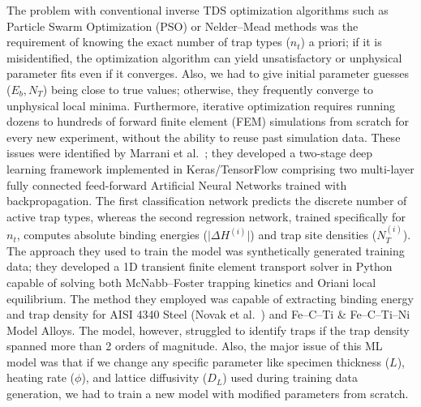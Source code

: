 \documentclass[a4paper,12pt,oneside]{report}
\begin{document}
The problem with conventional inverse TDS optimization algorithms such as Particle Swarm Optimization (PSO) or Nelder--Mead methods was the requirement of knowing the exact number of trap types ($n_t$) a priori; if it is misidentified, the optimization algorithm can yield unsatisfactory or unphysical parameter fits even if it converges. Also, we had to give initial parameter guesses ($E_b, N_T$) being close to true values; otherwise, they frequently converge to unphysical local minima. Furthermore, iterative optimization requires running dozens to hundreds of forward finite element (FEM) simulations from scratch for every new experiment, without the ability to reuse past simulation data. These issues were identified by Marrani et al.~\cite{Marrani2025}; they developed a two-stage deep learning framework implemented in Keras/TensorFlow comprising two multi-layer fully connected feed-forward Artificial Neural Networks trained with backpropagation. The first classification network predicts the discrete number of active trap types, whereas the second regression network, trained specifically for $n_t$, computes absolute binding energies ($\vert{}\Delta H^{(i)}\vert{}$) and trap site densities ($N_T^{(i)}$). The approach they used to train the model was synthetically generated training data; they developed a 1D transient finite element transport solver in Python capable of solving both McNabb--Foster trapping kinetics and Oriani local equilibrium. The method they employed was capable of extracting binding energy and trap density for AISI 4340 Steel (Novak et al.~\cite{Novak2010}) and Fe--C--Ti \& Fe--C--Ti--Ni Model Alloys. The model, however, struggled to identify traps if the trap density spanned more than 2 orders of magnitude. Also, the major issue of this ML model was that if we change any specific parameter like specimen thickness ($L$), heating rate ($\phi$), and lattice diffusivity ($D_L$) used during training data generation, we had to train a new model with modified parameters from scratch.
\end{document}
